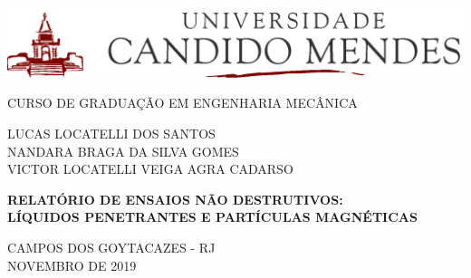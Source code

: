 \begin{titlepage}
    \begin{center}
        \includegraphics[width=1.0\textwidth]{figuras/ucam-header.png}

        \uppercase{Curso de graduação em engenharia mecânica}


        \vspace{1.64cm}

        \normalsize\uppercase{
            Lucas Locatelli dos Santos\\
            Nandara Braga da Silva Gomes\\
            Victor Locatelli Veiga Agra Cadarso
            }

        \vspace{5cm}

        \uppercase{\large{\textbf{relatório de ensaios não destrutivos:\\líquidos penetrantes e partículas magnéticas}}}

        \vfill


        \normalsize
        \uppercase{
        Campos dos Goytacazes - RJ
        \\
        Novembro de 2019
        }

    \end{center}
\end{titlepage}
